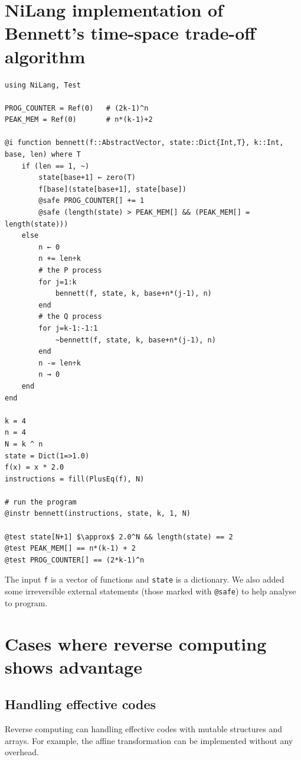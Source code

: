 \documentclass{article}
\newcommand{\<}{\langle}
\renewcommand{\>}{\rangle}
\theoremstyle{definition}\newtheorem{definition}{\textit{Definition}}
\begin{document}



\appendix

\section{NiLang implementation of Bennett's time-space trade-off algorithm}\label{app:bennett-nilang}
\begin{minipage}{.88\columnwidth}
    \begin{lstlisting}[mathescape=true,caption={NiLang implementation of the Bennett's time-space trade-off scheme.},label={lst:bennett-nilang}]
using NiLang, Test

PROG_COUNTER = Ref(0)   # (2k-1)^n
PEAK_MEM = Ref(0)       # n*(k-1)+2

@i function bennett(f::AbstractVector, state::Dict{Int,T}, k::Int, base, len) where T
    if (len == 1, ~)
        state[base+1] ← zero(T)
        f[base](state[base+1], state[base])
        @safe PROG_COUNTER[] += 1
        @safe (length(state) > PEAK_MEM[] && (PEAK_MEM[] = length(state)))
    else
        n ← 0
        n += len÷k
        # the P process
        for j=1:k
            bennett(f, state, k, base+n*(j-1), n)
        end
        # the Q process
        for j=k-1:-1:1
            ~bennett(f, state, k, base+n*(j-1), n)
        end
        n -= len÷k
        n → 0
    end
end

k = 4
n = 4
N = k ^ n
state = Dict(1=>1.0)
f(x) = x * 2.0
instructions = fill(PlusEq(f), N)

# run the program
@instr bennett(instructions, state, k, 1, N)

@test state[N+1] $\approx$ 2.0^N && length(state) == 2
@test PEAK_MEM[] == n*(k-1) + 2
@test PROG_COUNTER[] == (2*k-1)^n
\end{lstlisting}
\end{minipage}

The input \texttt{f} is a vector of functions and \texttt{state} is a dictionary.
We also added some irreversible external statements (those marked with \texttt{@safe}) to help analyse to program.

\section{Cases where reverse computing shows advantage}\label{app:rev-advantages}
\subsection{Handling effective codes}\label{app:effectivecode}
Reverse computing can handling effective codes with mutable structures and arrays.
For example, the affine transformation can be implemented without any overhead.
\end{document}
